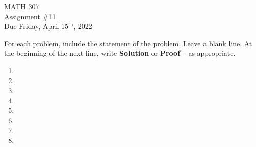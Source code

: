 \documentclass[12pt]{article}
\newcommand{\nl}{\vspace{0.1in}\noindent}
\begin{document}
\pagestyle{fancy}
\fancyhf{}

\noindent MATH 307 \\
Assignment \#11 \\  %
Due Friday, April 15$^{\text{th}}$, 2022

\nl For each problem, include the statement of the problem. Leave a blank line.  At the beginning of the next line, write \textbf{Solution} or \textbf{Proof} -- as appropriate.

\begin{enumerate}
  \item 
  \item \vspace{0.75in}
  \item 
  \item \vspace{1.5in}
  \item  \newpage
  \item  \newpage
  \item  \newpage
  \item 
\end{enumerate}
\end{document}
